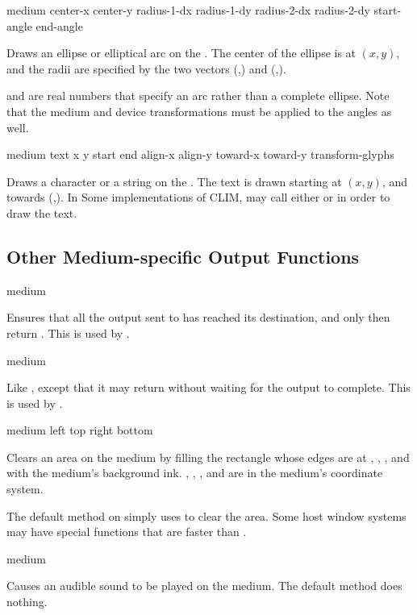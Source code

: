  {medium center-x center-y
                                    radius-1-dx radius-1-dy radius-2-dx radius-2-dy
                                    start-angle end-angle}


Draws an ellipse or elliptical arc on the  .  The
center of the ellipse is at $(x,y)$, and the radii are specified by the two
vectors (,) and
(,).

 and  are real numbers that specify an arc
rather than a complete ellipse.  Note that the medium and device transformations
must be applied to the angles as well.

 {medium text x y start end
                                 align-x align-y toward-x toward-y
                                 transform-glyphs}

Draws a character or a string on the  .  The text is
drawn starting at $(x,y)$, and towards (,).  In Some
implementations of CLIM,  may call either
 or  in order to draw the
text.

\subsection {Other Medium-specific Output Functions}

 {medium}

Ensures that all the output sent to  has reached its destination,
and only then return .  This is used by .

 {medium}

Like , except that it may return  without
waiting for the output to complete.  This is used by .

 {medium left top right bottom}

Clears an area on the {medium}  by filling the rectangle whose edges
are at , , , and  with the medium's
background ink.  , , , and  are in
the medium's coordinate system.

The default method on  simply uses  to
clear the area.  Some host window systems may have special functions that are faster
than .

 {medium}

Causes an audible sound to be played on the medium.  The default method
does nothing.
